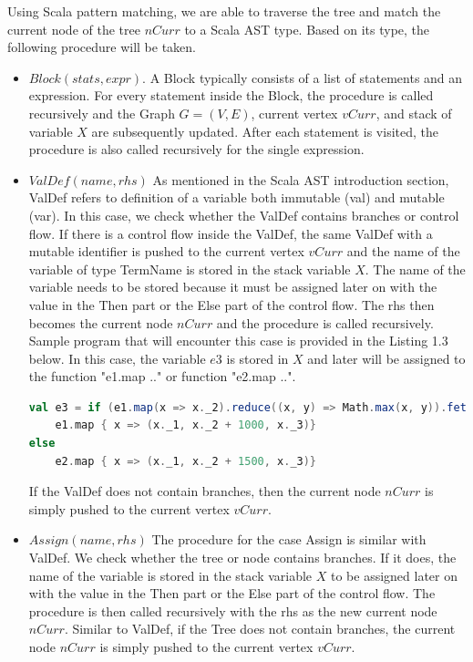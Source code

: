 Using Scala pattern matching, we are able to traverse the tree and match the current node of the tree $nCurr$ to a Scala AST type. Based on its type, the following procedure will be taken. 

\begin{itemize}

\item $Block(stats, expr)$.
A Block typically consists of a list of statements and an expression. For every statement inside the Block, the procedure is called recursively and the Graph $G=(V,E)$, current vertex $vCurr$, and stack of variable $X$ are subsequently updated. After each statement is visited, the procedure is also called recursively for the single expression.  

\item $ValDef(name,rhs)$
As mentioned in the Scala AST introduction section, ValDef refers to definition of a variable both immutable (val) and mutable (var). In this case, we check whether the ValDef contains branches or control flow. If there is a control flow inside the ValDef, the same ValDef with a mutable identifier is pushed to the current vertex $vCurr$ and the name of the variable of type TermName is stored in the stack variable $X$. The name of the variable needs to be stored because it must be assigned later on with the value in the Then part or the Else part of the control flow. The rhs then becomes the current node $nCurr$ and the procedure is called recursively.  Sample program that will encounter this case is provided in the Listing 1.3 below. In this case, the variable $e3$ is stored in $X$ and later will be assigned to the function "e1.map {..}" or function "e2.map {..}".
\begin{lstlisting}[language=scala,caption=ValDef with Branches, label = valdef]
val e3 = if (e1.map(x => x._2).reduce((x, y) => Math.max(x, y)).fetch().head > 50)
	e1.map { x => (x._1, x._2 + 1000, x._3)}
else
	e2.map { x => (x._1, x._2 + 1500, x._3)}
\end{lstlisting}

If the ValDef does not contain branches, then the current node $nCurr$ is simply pushed to the current vertex $vCurr$. 

\item $Assign(name,rhs)$
The procedure for the case Assign is similar with ValDef. We check whether the tree or node contains branches. If it does, the name of the variable is stored in the stack variable $X$ to be assigned later on with the value in the Then part or the Else part of the control flow. The procedure is then called recursively with the rhs as the new current node $nCurr$. Similar to ValDef, if the Tree does not contain branches, the current node $nCurr$ is simply pushed to the current vertex $vCurr$.


\end{itemize}

